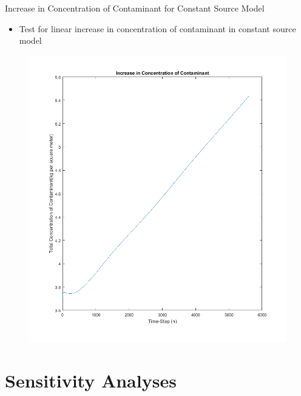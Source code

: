 \documentclass[10pt]{beamer}
\begin{document}
\begin{frame}{Increase in Concentration of Contaminant for Constant Source Model}\label{ConstIncrease}
\begin{itemize}
\item Test for linear increase in concentration of contaminant in constant source model
\end{itemize}

\begin{figure} 
\includegraphics[trim=0mm 0mm 0mm 0mm,clip,width=0.5\linewidth]{constincrease.png}
\end{figure}
\hyperlink{Questions}{}
\end{frame}

\section{Sensitivity Analyses}
\end{document}
